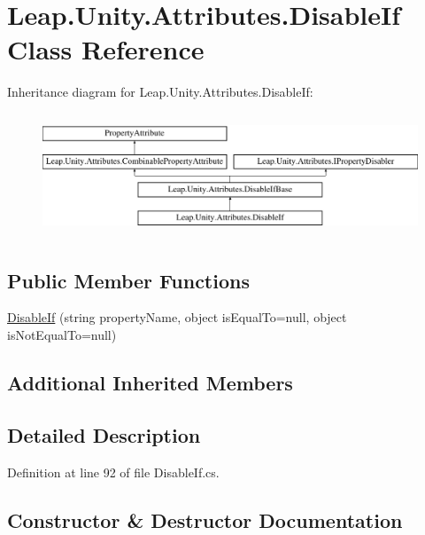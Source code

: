 \hypertarget{class_leap_1_1_unity_1_1_attributes_1_1_disable_if}{}\section{Leap.\+Unity.\+Attributes.\+Disable\+If Class Reference}
\label{class_leap_1_1_unity_1_1_attributes_1_1_disable_if}
Inheritance diagram for Leap.\+Unity.\+Attributes.\+Disable\+If\+:\begin{figure}[H]
\begin{center}
\leavevmode
\includegraphics[height=3.696370cm]{class_leap_1_1_unity_1_1_attributes_1_1_disable_if}
\end{center}
\end{figure}
\subsection*{Public Member Functions}
\begin{DoxyCompactItemize}
\item 
\mbox{\hyperlink{class_leap_1_1_unity_1_1_attributes_1_1_disable_if_aec04a1d2e76290393f371ad231f31c73}{Disable\+If}} (string property\+Name, object is\+Equal\+To=null, object is\+Not\+Equal\+To=null)
\end{DoxyCompactItemize}
\subsection*{Additional Inherited Members}


\subsection{Detailed Description}


Definition at line 92 of file Disable\+If.\+cs.



\subsection{Constructor \& Destructor Documentation}
\mbox{\label{class_leap_1_1_unity_1_1_attributes_1_1_disable_if_aec04a1d2e76290393f371ad231f31c73}} 

